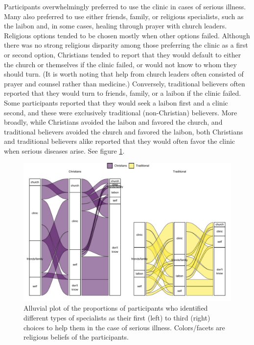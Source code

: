 \documentclass[
  11pt,
]{article}
\begin{document}
Participants overwhelmingly preferred to use the clinic in cases of serious illness. Many also preferred to use either friends, family, or religious specialists, such as the laibon and, in some cases, healing through prayer with church leaders. Religious options tended to be chosen mostly when other options failed. Although there was no strong religious disparity among those preferring the clinic as a first or second option, Christians tended to report that they would default to either the church or themselves if the clinic failed, or would not know to whom they should turn. (It is worth noting that help from church leaders often consisted of prayer and counsel rather than medicine.) Conversely, traditional believers often reported that they would turn to friends, family, or a laibon if the clinic failed. Some participants reported that they would seek a laibon first and a clinic second, and these were exclusively traditional (non-Christian) believers. More broadly, while Christians avoided the laibon and favored the church, and traditional believers avoided the church and favored the laibon, both Christians and traditional believers alike reported that they would often favor the clinic when serious diseases arise. See figure \ref{fig:fieldplotillness}.

\begin{landscape}

\begin{figure}[p]

{\centering \includegraphics{magic-healers-article2_files/figure-latex/fieldplotillness-1} 

}

\caption{Alluvial plot of the proportions of participants who identified different types of specialists as their first (left) to third (right) choices to help them in the case of serious illness. Colors/facets are religious beliefs of the participants.}\label{fig:fieldplotillness}
\end{figure}

\end{landscape}
\end{document}
